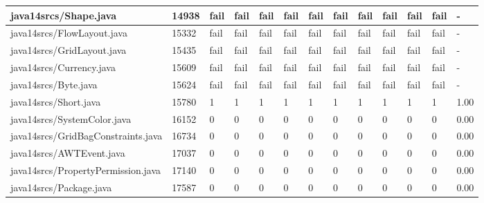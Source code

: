 \begin{tabular}{|l|l|l|l|l|l|l|l|l|l|l|l|l|}
\hline
java14srcs/Shape.java                              & 14938       & fail      & fail      & fail      & fail      & fail      & fail      & fail      & fail      & fail      & fail      & -         \\
\hline
java14srcs/FlowLayout.java                         & 15332       & fail      & fail      & fail      & fail      & fail      & fail      & fail      & fail      & fail      & fail      & -         \\
\hline
java14srcs/GridLayout.java                         & 15435       & fail      & fail      & fail      & fail      & fail      & fail      & fail      & fail      & fail      & fail      & -         \\
\hline
java14srcs/Currency.java                           & 15609       & fail      & fail      & fail      & fail      & fail      & fail      & fail      & fail      & fail      & fail      & -         \\
\hline
java14srcs/Byte.java                               & 15624       & fail      & fail      & fail      & fail      & fail      & fail      & fail      & fail      & fail      & fail      & -         \\
\hline
java14srcs/Short.java                              & 15780       & 1         & 1         & 1         & 1         & 1         & 1         & 1         & 1         & 1         & 1         & 1.00      \\
\hline
java14srcs/SystemColor.java                        & 16152       & 0         & 0         & 0         & 0         & 0         & 0         & 0         & 0         & 0         & 0         & 0.00      \\
\hline
java14srcs/GridBagConstraints.java                 & 16734       & 0         & 0         & 0         & 0         & 0         & 0         & 0         & 0         & 0         & 0         & 0.00      \\
\hline
java14srcs/AWTEvent.java                           & 17037       & 0         & 0         & 0         & 0         & 0         & 0         & 0         & 0         & 0         & 0         & 0.00      \\
\hline
java14srcs/PropertyPermission.java                 & 17140       & 0         & 0         & 0         & 0         & 0         & 0         & 0         & 0         & 0         & 0         & 0.00      \\
\hline
java14srcs/Package.java                            & 17587       & 0         & 0         & 0         & 0         & 0         & 0         & 0         & 0         & 0         & 0         & 0.00      \\

\end{tabular}
